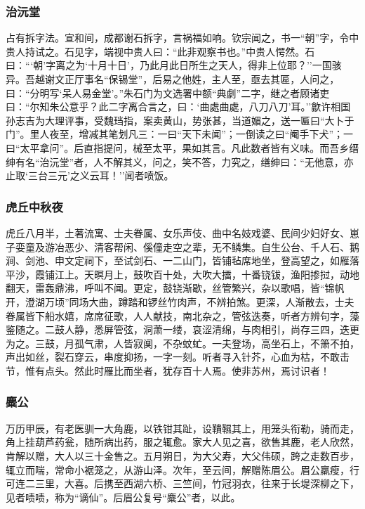 \documentclass[]{article}
\begin{document}
\hypertarget{header-n393}{%
\subsubsection{治沅堂}\label{header-n393}}

占有拆字法。宣和间，成都谢石拆字，言祸福如响。钦宗闻之，书一``朝''字，令中贵人持试之。石见字，端视中贵人曰：``此非观察书也。''中贵人愕然。石曰：```朝'字离之为`十月十日'，乃此月此日所生之天人，得非上位耶？''一国骇异。吾越谢文正厅事名``保锡堂''，后易之他姓，主人至，亟去其匾，人问之，曰：``分明写`呆人易金堂'。''朱石门为文选署中额``典劇''二字，继之者顾诸吏曰：``尔知朱公意乎？此二字离合言之，曰：`曲處曲處，八刀八刀'耳。''歙许相国孙志吉为大理评事，受魏珰指，案卖黄山，势张甚，当道媚之，送一匾曰``大卜于门''。里人夜至，增减其笔划凡三：一曰``天下未闻''；一倒读之曰``阉手下犬''；一曰``太平拿问''。后直指提问，械至太平，果如其言。凡此数者皆有义味。而吾乡缙绅有名``治沅堂''者，人不解其义，问之，笑不答，力究之，缮绅曰：``无他意，亦止取`三台三元'之义云耳！''闻者喷饭。

\hypertarget{header-n398}{%
\subsubsection{虎丘中秋夜}\label{header-n398}}

虎丘八月半，土著流寓、士夫眷属、女乐声伎、曲中名妓戏婆、民间少妇好女、崽子娈童及游冶恶少、清客帮闲、傒僮走空之辈，无不鳞集。自生公台、千人石、鹅涧、剑池、申文定祠下，至试剑石、一二山门，皆铺毡席地坐，登高望之，如雁落平沙，霞铺江上。天暝月上，鼓吹百十处，大吹大擂，十番铙钹，渔阳掺挝，动地翻天，雷轰鼎沸，呼叫不闻。更定，鼓铙渐歇，丝管繁兴，杂以歌唱，皆``锦帆开，澄湖万顷''同场大曲，蹲踏和锣丝竹肉声，不辨拍煞。更深，人渐散去，士夫眷属皆下船水嬉，席席征歌，人人献技，南北杂之，管弦迭奏，听者方辨句字，藻鉴随之。二鼓人静，悉屏管弦，洞萧一缕，哀涩清绵，与肉相引，尚存三四，迭更为之。三鼓，月孤气肃，人皆寂阒，不杂蚊虻。一夫登场，高坐石上，不箫不拍，声出如丝，裂石穿云，串度抑扬，一字一刻。听者寻入针芥，心血为枯，不敢击节，惟有点头。然此时雁比而坐者，犹存百十人焉。使非苏州，焉讨识者！

\hypertarget{header-n403}{%
\subsubsection{麋公}\label{header-n403}}

万历甲辰，有老医驯一大角鹿，以铁钳其趾，设鞼韅其上，用笼头衔勒，骑而走，角上挂葫芦药瓮，随所病出药，服之辄愈。家大人见之喜，欲售其鹿，老人欣然，肯解以赠，大人以三十金售之。五月朔日，为大父寿，大父伟硕，跨之走数百步，辄立而喘，常命小裾笼之，从游山泽。次年，至云间，解赠陈眉公。眉公羸瘦，行可连二三里，大喜。后携至西湖六桥、三竺间，竹冠羽衣，往来于长堤深柳之下，见者啧啧，称为``谪仙''。后眉公复号``麋公''者，以此。
\end{document}

